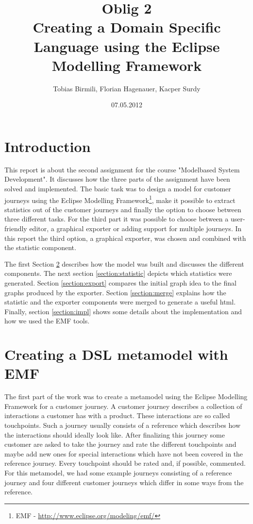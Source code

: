 \documentclass[12pt]{scrartcl}
\title{Oblig 2 \\ Creating a Domain Specific Language using the Eclipse Modelling Framework}
\author{Tobias Birmili, Florian Hagenauer, Kacper Surdy}
\date{07.05.2012}
\begin{document}
\maketitle

\tableofcontents

\section{Introduction}

This report is about the second assignment for the course "Modelbased System Development". It discusses how the three
parts of the assignment have been solved and implemented. The basic task was to design a model for customer journeys using
the Eclipse Modelling Framework\footnote{EMF - \url{http://www.eclipse.org/modeling/emf/}}, make it possible to extract 
statistics out of the customer journeys and finally the option to choose between three different tasks. For the third part 
it was possible to choose between a user-friendly editor, a graphical exporter or adding support for multiple journeys. In
this report the third option, a graphical exporter, was chosen and combined with the statistic component.

The first Section \ref{section:model} describes how the model was built and discusses the different components. The next
section \ref{section:statistic} depicts which statistics were generated. Section \ref{section:export}
compares the initial graph idea to the final graphs produced by the exporter. Section \ref{section:merge} explains how
the statistic and the exporter components were merged to generate a useful html. Finally, section \ref{section:impl} shows
some details about the implementation and how we used the EMF tools.

\section{Creating a DSL metamodel with EMF} 
\label{section:model}

The first part of the work was to create a metamodel using the Eclipse Modelling Framework for a customer
journey. A customer journey describes a collection of interactions a customer has with a product. These interactions are
so called touchpoints. Such a journey usually consists of a reference which describes how the interactions should ideally
look like. After finalizing this journey some customer are asked to take the journey and rate the different touchpoints and 
maybe add new ones for special interactions which have not been covered in the reference journey. Every touchpoint should 
be rated and, if possible, commented. For this metamodel, we had some example journeys consisting of a reference journey 
and four different customer journeys which differ in some ways from the reference. 
\end{document}
